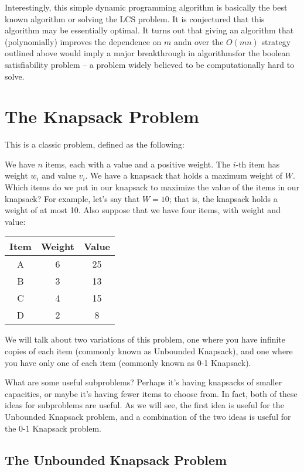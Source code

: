 \documentclass [12pt]{article}
\theoremstyle{definition}
\begin{document}
Interestingly, this simple dynamic programming algorithm is basically the best known algorithm or solving the LCS problem. It is conjectured that this algorithm may be essentially optimal. It turns out that giving an algorithm that (polynomially) improves the dependence on $m$ andn over the $O(mn)$ strategy outlined above would imply a major breakthrough in algorithmsfor the boolean satisfiability problem – a problem widely believed to be computationally hard to solve.

\section{The Knapsack Problem}
 
This is a classic problem, defined as the following:

We have $n$ items, each with a value and a positive weight. The $i$-th item has weight $w_i$ and value $v_i$. We have a knapsack that holds a maximum weight of $W$. Which items do we put in our knapsack to maximize the value of the items in our knapsack? For example, let’s say that $W = 10$; that is, the knapsack holds a weight of at most 10. Also suppose that we have four items, with weight and value:

\begin{table}[]
\begin{tabular}{c|c|c}
Item & Weight & Value \\
\hline
A & 6 &  25 \\
B & 3 & 13 \\
C & 4 & 15 \\
D & 2 & 8
\end{tabular}
\end{table}

We will talk about two variations of this problem, one where you have infinite copies of each item (commonly known as Unbounded Knapsack), and one where you have only one of each item (commonly known as 0-1 Knapsack). 

What are some useful subproblems? Perhaps it’s having knapsacks of smaller capacities, or maybe it’s having fewer items to choose from. In fact, both of these ideas for subproblems are useful. As we will see, the first idea is useful for the Unbounded Knapsack problem, and a combination of the two ideas is useful for the 0-1 Knapsack problem.

\subsection{The Unbounded Knapsack Problem} 
\end{document}
